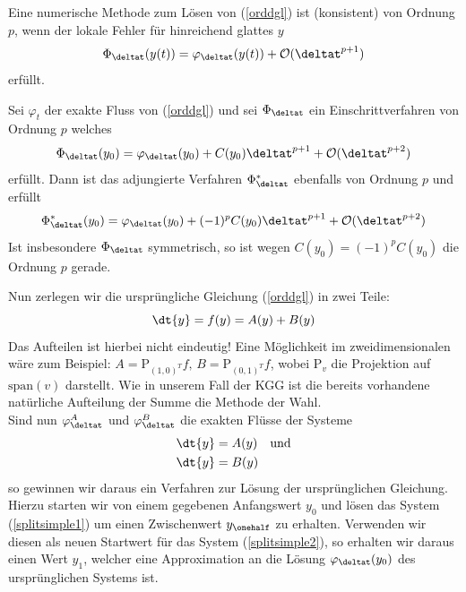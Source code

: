 \begin{mathdef}[Konsistenzordnung]
Eine numerische Methode zum Lösen von (\ref{orddgl}) ist (konsistent) von Ordnung $p$, wenn der lokale Fehler für hinreichend glattes $y$
\[\Phi_{\deltat}(y(t))=\varphi_{\deltat}(y(t))+\mathcal{O}(\deltat^{p+1})\] erfüllt.
\end{mathdef}
\begin{maththeorem}
\label{adjfloworder}
Sei $\varphi_t$ der exakte Fluss von (\ref{orddgl}) und sei $\Phi_{\deltat}$ ein Einschrittverfahren von Ordnung $p$ welches 
\[\Phi_{\deltat}(y_0)=\varphi_{\deltat}(y_0)+C(y_0)\deltat^{p+1}+\mathcal{O}(\deltat^{p+2})\]
erfüllt. Dann ist das adjungierte Verfahren $\Phi_{\deltat}^*$ ebenfalls von Ordnung $p$ und erfüllt
\[\Phi_{\deltat}^*(y_0)=\varphi_{\deltat}(y_0)+(-1)^{p}C(y_0)\deltat^{p+1}+\mathcal{O}(\deltat^{p+2})\]
Ist insbesondere $\Phi_{\deltat}$ symmetrisch, so ist wegen $C(y_0)=(-1)^pC(y_0)$ die Ordnung $p$ gerade.
\end{maththeorem}
Nun zerlegen wir die ursprüngliche Gleichung (\ref{orddgl}) in zwei Teile:
\[\dt{y}=f(y)=A(y)+B(y) \]
Das Aufteilen ist hierbei nicht eindeutig! Eine Möglichkeit im zweidimensionalen wäre zum Beispiel: $A=\text{P}_{(1,0)^T}f,\,B=\text{P}_{(0,1)^T}f$, wobei $\text{P}_v$ die Projektion auf $\text{span}(v)$ darstellt. Wie in unserem Fall der KGG ist die bereits vorhandene natürliche Aufteilung der Summe die Methode der Wahl.\\
Sind nun $\varphi_{\deltat}^A$ und $\varphi_{\deltat}^B$ die exakten Flüsse der Systeme
\begin{align}
\dt{y}&=A(y)\quad \text{und} \label{splitsimple1}\\ 
\dt{y}&=B(y) \label{splitsimple2}
\end{align}
so gewinnen wir daraus ein Verfahren zur Lösung der ursprünglichen Gleichung.\\
Hierzu starten wir von einem gegebenen Anfangswert $y_0$ und lösen das System (\ref{splitsimple1}) um einen Zwischenwert $y_{\onehalf}$ zu erhalten. Verwenden wir diesen als neuen Startwert für das System (\ref{splitsimple2}), so erhalten wir daraus einen Wert $y_1$, welcher eine Approximation an die Lösung $\varphi_{\deltat}(y_0)$ des ursprünglichen Systems ist.\\[1cm]
\noindent\begin{minipage}{0.3\textwidth}


\end{minipage}%

